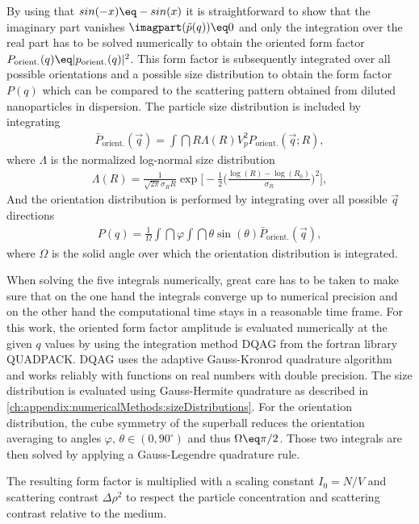 \documentclass[\main/dresen_thesis.tex]{subfiles}
\begin{document}
    By using that $sin(-x) \eq - sin(x)$ it is straightforward to show that the imaginary part vanishes $\imagpart (\tilde{p}(q)) \eq 0$ and only the integration over the real part has to be solved numerically to obtain the oriented form factor $P_\mathrm{orient.}(q) \eq |p_\mathrm{orient.}(q)|^2$. This form factor is subsequently integrated over all possible orientations and a possible size distribution to obtain the form factor $P(q)$ which can be compared to the scattering pattern obtained from diluted nanoparticles in dispersion.
    The particle size distribution is included by integrating
    \begin{align}
      \bar{P}_\mathrm{orient.}(\vec{q}) = \int \dint R \Lambda(R) V_p^2 P_\mathrm{orient.}(\vec{q}; R),
    \end{align}
    where $\Lambda$ is the normalized log-normal size distribution
    \begin{align}
      \Lambda(R) = \frac{1}{\sqrt{2 \pi} \sigma_R R} \exp \Bigg[ - \frac{1}{2} \bigg(\frac{\log(R) - \log(R_0)}{\sigma_R} \bigg)^2 \Bigg],
    \end{align}
    And the orientation distribution is performed by integrating over all possible $\vec{q}$ directions
    \begin{align}
      P(q) = \frac{1}{\Omega}
      \int \dint \varphi \int \dint \theta \sin (\theta) \bar{P}_\mathrm{orient.}(\vec{q}),
      \label{eq:superball_intensity_equation}
    \end{align}
    where $\Omega$ is the solid angle over which the orientation distribution is integrated.

    When solving the five integrals numerically, great care has to be taken to make sure that on the one hand the integrals converge up to numerical precision and on the other hand the computational time stays in a reasonable time frame.
    For this work, the oriented form factor amplitude is evaluated numerically at the given $q$ values by using the integration method DQAG from the fortran library QUADPACK.
    DQAG uses the adaptive Gauss-Kronrod quadrature algorithm and works reliably with functions on real numbers with double precision.
    The size distribution is evaluated using Gauss-Hermite quadrature as described in \ref{ch:appendix:numericalMethods:sizeDistributions}.
    For the orientation distribution, the cube symmetry of the superball reduces the orientation averaging to angles $\varphi,\, \theta \in (0, 90 ^\circ)$ and thus $\Omega \eq \pi / 2$. Those two integrals are then solved by applying a Gauss-Legendre quadrature rule.

    The resulting form factor is multiplied with a scaling constant $I_0=N/V$ and scattering contrast $\Delta \rho^2$ to respect the particle concentration and scattering contrast relative to the medium.
\end{document}
